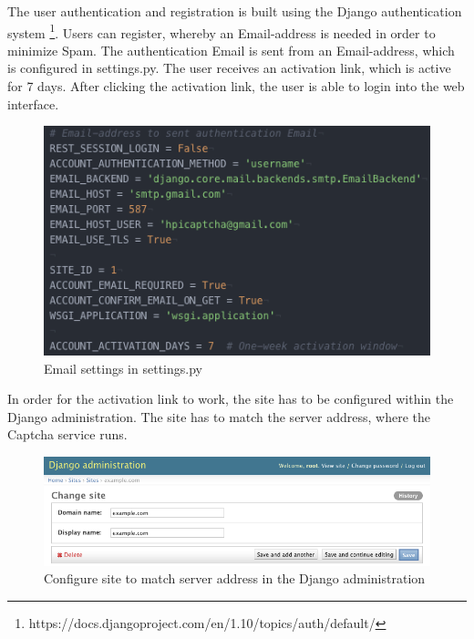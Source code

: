 The user authentication and registration is built using the Django authentication system \footnote{https://docs.djangoproject.com/en/1.10/topics/auth/default/}. Users can register, whereby an Email-address is needed in order to minimize Spam. The authentication Email is sent from an Email-address, which is configured in settings.py.
The user receives an activation link, which is active for 7 days. After clicking the activation link, the user is able to login into the web interface.
\begin{figure}[H]
\centering
\includegraphics[width=0.8\linewidth]{content/figures/email_settings.png}
\caption{Email settings in settings.py}
\label{fig:email_settings}
\end{figure}

In order for the activation link to work, the site has to be configured within the Django administration. The site has to match the server address, where the Captcha service runs.
\begin{figure}[H]
\centering
\includegraphics[width=1\linewidth]{content/figures/site_administration.png}
\caption{Configure site to match server address in the Django administration}
\label{fig:site_administration}
\end{figure}

\clearpage
